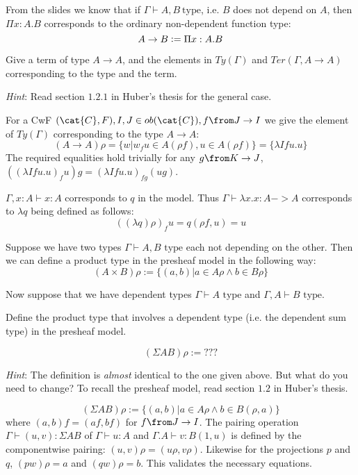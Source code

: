 \begin{exercise}
  From the slides we know that if $\Gamma \vdash A, B ~\text{type}$, i.e. $B$
  does not depend on $A$, then $\Pi x: A. B$ corresponds to the ordinary
  non-dependent function type:
  \begin{equation*}
    A \to B \vcentcolon= \Pi x: A. B
  \end{equation*}

  Give a term of type $A \to A$, and the elements in $\mathit{Ty}(\Gamma)$ and
  $\mathit{Ter}(\Gamma, A \to A)$ corresponding to the type and the term.

  \emph{Hint}: Read section $1.2.1$ in Huber's thesis for the general case.
\end{exercise}
\begin{answer}
  For a CwF $(\cat{C}, F), I, J \in ob(\cat{C}), f \from J \to I$ we give the
  element of $\mathit{Ty}(\Gamma)$ corresponding to the type $A \to A$:
  \[
    (A \to A)\rho = \{w | w_f u \in A(\rho f), u \in A(\rho f)\} = \{\lambda I f u.u\}
  \]
  The required equalities hold trivially for any $g \from K \to J$, $((\lambda
  I f u.u)_f u) g = (\lambda I f u.u)_{fg} (ug)$.

  $\Gamma, x : A \vdash x : A$ corresponds to $q$ in the model. Thus $\Gamma
  \vdash \lambda x.x : A -> A$ corresponds to $\lambda q$ being defined as
  follows:
  \[
    ((\lambda q) \rho)_f u = q(\rho f, u) = u
  \]
\end{answer}

\begin{exercise}
  Suppose we have two types $\Gamma \vdash A,B \text{ type}$ each not depending
  on the other.  Then we can define a product type in the presheaf model in the
  following way:
  \[
    (A \times B)\rho := \{(a,b) | a \in A\rho \land b \in B\rho\}
  \]

  Now suppose that we have dependent types $\Gamma \vdash A \text{ type}$ and
  $\Gamma, A \vdash B \text{ type}$.

  Define the product type that involves a dependent type (i.e. the dependent
  sum type) in the presheaf model.

  \[
    (\Sigma AB)\rho := ???
  \]

  \emph{Hint}: The definition is \emph{almost} identical to the one given
  above. But what do you need to change? To recall the presheaf model, read
  section $1.2$ in Huber's thesis.
\end{exercise}
\begin{answer}
  \[
    (\Sigma AB)\rho := \{(a,b) | a \in A\rho \land b \in B(\rho, a)\}
  \]
  where $(a, b)f = (af, bf)$ for $f \from J \to I$. The pairing operation
  $\Gamma \vdash (u, v) : \Sigma AB$ of $\Gamma \vdash u : A$ and $\Gamma.A
  \vdash v : B(1, u)$ is defined by the componentwise pairing: $(u, v)\rho =
  (u\rho, v\rho)$. Likewise for the projections $p$ and $q$, $(pw)\rho = a$ and
  $(qw)\rho = b$. This validates the necessary equations.
\end{answer}

